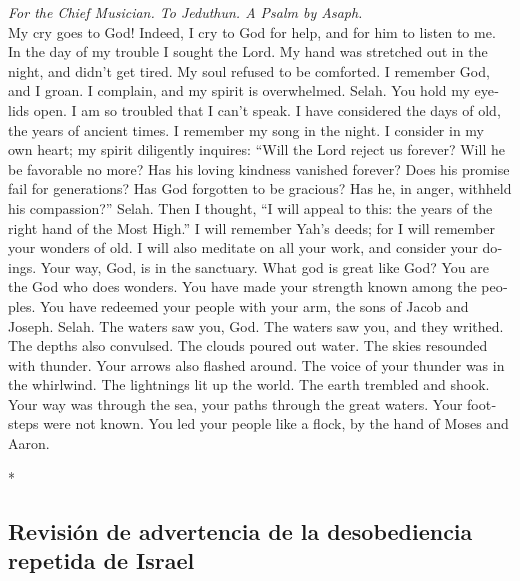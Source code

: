 \begin{paracol}{2}
\begin{otherlanguage}{english}
\emph{For the Chief Musician. To Jeduthun. A Psalm by Asaph.}\\
 My cry goes to God! Indeed, I cry to God for help, and
for him to listen to me.  In the day of my trouble I
sought the Lord. My hand was stretched out in the night, and didn't get
tired. My soul refused to be comforted.  I remember God,
and I groan. I complain, and my spirit is overwhelmed. Selah.
 You hold my eyelids open. I am so troubled that I can't
speak.  I have considered the days of old, the years of
ancient times.  I remember my song in the night. I
consider in my own heart; my spirit diligently inquires: 
``Will the Lord reject us forever? Will he be favorable no more?
 Has his loving kindness vanished forever? Does his
promise fail for generations?  Has God forgotten to be
gracious? Has he, in anger, withheld his compassion?'' Selah.
 Then I thought, ``I will appeal to this: the years of
the right hand of the Most High.''  I will remember Yah's
deeds; for I will remember your wonders of old.  I will
also meditate on all your work, and consider your doings.
 Your way, God, is in the sanctuary. What god is great
like God?  You are the God who does wonders. You have
made your strength known among the peoples.  You have
redeemed your people with your arm, the sons of Jacob and Joseph. Selah.
 The waters saw you, God. The waters saw you, and they
writhed. The depths also convulsed.  The clouds poured
out water. The skies resounded with thunder. Your arrows also flashed
around.  The voice of your thunder was in the whirlwind.
The lightnings lit up the world. The earth trembled and shook.
 Your way was through the sea, your paths through the
great waters. Your footsteps were not known.  You led
your people like a flock, by the hand of Moses and Aaron.

\end{otherlanguage}

\switchcolumn[0]*

\hypertarget{revisiuxf3n-de-advertencia-de-la-desobediencia-repetida-de-israel}{%
\subsection{Revisión de advertencia de la desobediencia repetida de
Israel}\label{revisiuxf3n-de-advertencia-de-la-desobediencia-repetida-de-israel}}


\end{paracol}

